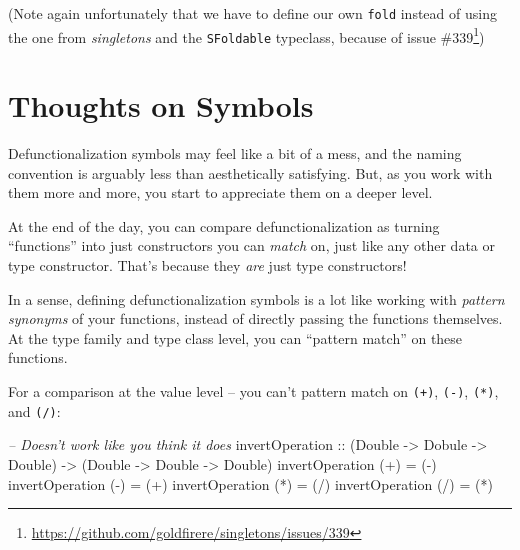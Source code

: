 \documentclass[]{article}
\newenvironment{Shaded}{}{}
\newcommand{\CommentTok}[1]{\textcolor[rgb]{0.38,0.63,0.69}{\textit{#1}}}
\newcommand{\DataTypeTok}[1]{\textcolor[rgb]{0.56,0.13,0.00}{#1}}
\newcommand{\FunctionTok}[1]{\textcolor[rgb]{0.02,0.16,0.49}{#1}}
\newcommand{\NormalTok}[1]{#1}
\newcommand{\OtherTok}[1]{\textcolor[rgb]{0.00,0.44,0.13}{#1}}
\renewcommand{\href}[2]{#2\footnote{\url{#1}}}
\begin{document}
(Note again unfortunately that we have to define our own \texttt{fold} instead
of using the one from \emph{singletons} and the \texttt{SFoldable} typeclass,
because of \href{https://github.com/goldfirere/singletons/issues/339}{issue
\#339})

\hypertarget{thoughts-on-symbols}{%
\section{Thoughts on Symbols}\label{thoughts-on-symbols}}

Defunctionalization symbols may feel like a bit of a mess, and the naming
convention is arguably less than aesthetically satisfying. But, as you work with
them more and more, you start to appreciate them on a deeper level.

At the end of the day, you can compare defunctionalization as turning
``functions'' into just constructors you can \emph{match} on, just like any
other data or type constructor. That's because they \emph{are} just type
constructors!

In a sense, defining defunctionalization symbols is a lot like working with
\emph{pattern synonyms} of your functions, instead of directly passing the
functions themselves. At the type family and type class level, you can ``pattern
match'' on these functions.

For a comparison at the value level -- you can't pattern match on \texttt{(+)},
\texttt{(-)}, \texttt{(*)}, and \texttt{(/)}:

\begin{Shaded}
\begin{Highlighting}[]
\CommentTok{-- Doesn't work like you think it does}
\OtherTok{invertOperation ::}\NormalTok{ (}\DataTypeTok{Double} \OtherTok{->} \DataTypeTok{Dobule} \OtherTok{->} \DataTypeTok{Double}\NormalTok{) }\OtherTok{->}\NormalTok{ (}\DataTypeTok{Double} \OtherTok{->} \DataTypeTok{Double} \OtherTok{->} \DataTypeTok{Double}\NormalTok{)}
\NormalTok{invertOperation (}\FunctionTok{+}\NormalTok{) }\FunctionTok{=}\NormalTok{ (}\FunctionTok{-}\NormalTok{)}
\NormalTok{invertOperation (}\FunctionTok{-}\NormalTok{) }\FunctionTok{=}\NormalTok{ (}\FunctionTok{+}\NormalTok{)}
\NormalTok{invertOperation (}\FunctionTok{*}\NormalTok{) }\FunctionTok{=}\NormalTok{ (}\FunctionTok{/}\NormalTok{)}
\NormalTok{invertOperation (}\FunctionTok{/}\NormalTok{) }\FunctionTok{=}\NormalTok{ (}\FunctionTok{*}\NormalTok{)}
\end{Highlighting}
\end{Shaded}
\end{document}
